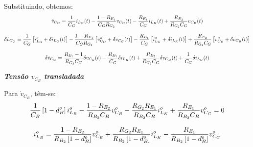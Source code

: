\documentclass{article}
\newcommand{\nle}{%
  \notag \\[8pt]
}
\begin{document}
Substituindo, obtemos:
\begin{gather}
  \dot{v}_{C_G} = \frac{1}{C_G} i_{L_G}(t) - \frac{1 - R_{E_1}}{C_G R_{G_2}} v_{C_G}(t) - \frac{R_{E_1}}{C_G} i_{L_K}(t) + \frac{R_{E_2}}{R_{G_2} C_G} v_{C_B}(t) \nle
  \delta \dot{v}_{C_G} = \frac{1}{C_G} \left[i_{L_G}^o + \delta i_{L_G}(t)\right]
  - \frac{1 - R_{E_1}}{C_G R_{G_2}} \left[v_{C_G}^o + \delta v_{C_G}(t) \right]
  - \frac{R_{E_1}}{C_G} \left[i_{L_K}^o + \delta i_{L_K}(t)\right]
  + \frac{R_{E_2}}{R_{G_2} C_G} \left[v_{C_B}^o + \delta v_{C_B}(t)\right] \nle
  \delta \dot{v}_{C_G} = \frac{R_{E_1} - 1}{R_{G_2} C_G} \delta v_{C_G}(t)
  - \frac{R_{E_1}}{C_G} \delta i_{L_K}(t)
  + \frac{R_{E_2}}{R_{G_2} C_G} \delta v_{C_B}(t) + \frac{1}{C_G} \delta i_{L_G}(t)
\end{gather}

\textbf{\textit{Tensão $v_{C_B}$ transladada}} \vspace*{12pt}

Para $\dot{v}_{C_B}$, têm-se:
\begin{gather}
  \frac{1}{C_B} \left[1 - d_B^o\right] i_{L_B}^o - \frac{1 - R_{E_2}}{R_{B_2}C_B} v_{C_B}^o - \frac{R_{G_2} R_{E_1}}{R_{B_2} C_B} i_{L_K}^o + \frac{R_{E_1}}{R_{B_2} C_B} v_{C_G}^o = 0 \nle
  i_{L_B}^o = \frac{1 - R_{E_2}}{R_{B_2} \left[1 - d_B^o\right]} v_{C_B}^o + \frac{R_{G_2} R_{E_1}}{R_{B_2} \left[1 - d_B^o\right]} i_{L_K}^o - \frac{R_{E_1}}{R_{B_2} \left[1 - d_B^o\right]} v_{C_G}^o
\end{gather}
\end{document}
